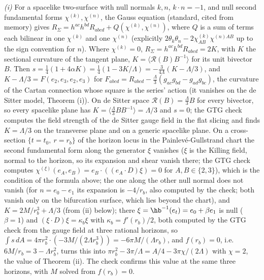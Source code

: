 \emph{(i)} For a spacelike two-surface with null normals $k, n$, $k\cdot n = -1$, and null second fundamental forms $\chi^{(k)}, \chi^{(n)}$, the Gauss equation (standard, cited from memory) gives $R_{\Sigma} = h^{ac}h^{bd}R_{abcd} + Q(\chi^{(k)}, \chi^{(n)})$, where $Q$ is a sum of terms each bilinear in one $\chi^{(k)}$ and one $\chi^{(n)}$ (explicitly $2\theta_{k}\theta_{n} - 2\chi^{(k)}_{AB}\chi^{(n)AB}$ up to the sign convention for $n$). Where $\chi^{(k)} = 0$, $R_{\Sigma} = h^{ac}h^{bd}R_{abcd} = 2K$, with $K$ the sectional curvature of the tangent plane, $K = \langle\mathcal{R}(B)B^{-1}\rangle$ for its unit bivector $B$. Then $s = \tfrac14(1 + 4\alpha K) = \tfrac14(1 - 3K/\Lambda) = -\tfrac{3}{4\Lambda}(K - \Lambda/3)$, and $K - \Lambda/3 = F(e_{2}, e_{3}, e_{2}, e_{3})$ for $F_{abcd} = R_{abcd} - \tfrac{\Lambda}{3}(g_{ac}g_{bd} - g_{ad}g_{bc})$, the curvature of the Cartan connection whose square is the series' action (it vanishes on the de Sitter model, Theorem (i)). On de Sitter space $\mathcal{R}(B) = \tfrac{\Lambda}{3}B$ for every bivector, so every spacelike plane has $K = \langle\tfrac{\Lambda}{3}BB^{-1}\rangle = \Lambda/3$ and $s = 0$; the GTG check computes the field strength of the de Sitter gauge field in the flat slicing and finds $K = \Lambda/3$ on the transverse plane and on a generic spacelike plane. On a cross-section $\{t = t_{0},\ r = r_{b}\}$ of the horizon locus in the Painlev\'e-Gullstrand chart the second fundamental form along the generator $\xi$ vanishes ($\xi$ is the Killing field, normal to the horizon, so its expansion and shear vanish there; the GTG check computes $\chi^{(\xi)}(e_{A}, e_{B}) = e_{B}\cdot((e_{A}\cdot D)\xi) = 0$ for $A, B \in \{2, 3\}$), which is the condition of the formula above; the one along the other null normal does not vanish (for $n = e_{0} - e_{1}$ its expansion is $-4/r_{b}$, also computed by the check; both vanish only on the bifurcation surface, which lies beyond the chart), and $K = 2M/r_{b}^{3} + \Lambda/3$ (from (ii) below); there $\xi = \hb^{-1}(e_{t}) = e_{0} + \beta e_{1}$ is null ($\beta = 1$) and $(\xi\cdot D)\xi = \kappa_{b}\xi$ with $\kappa_{b} = f'(r_{b})/2$, both computed by the GTG check from the gauge field at three rational horizons, so $\int s\,dA = 4\pi r_{b}^{2}\cdot(-3M/(2\Lambda r_{b}^{3})) = -6\pi M/(\Lambda r_{b})$, and $f(r_{b}) = 0$, i.e. $6M/r_{b} = 3 - \Lambda r_{b}^{2}$, turns this into $\pi r_{b}^{2} - 3\pi/\Lambda = A/4 - 3\pi\chi/(2\Lambda)$ with $\chi = 2$, the value of Theorem (ii). The check confirms this value at the same three horizons, with $M$ solved from $f(r_{b}) = 0$.


